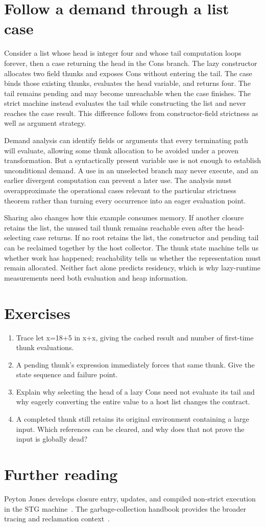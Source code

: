 \section{Follow a demand through a list case}
\label{sec:ch92-demand-example}
Consider a list whose head is integer four and whose tail computation loops forever, then a case returning the head in the Cons branch.
The lazy constructor allocates two field thunks and exposes Cons without entering the tail.
The case binds those existing thunks, evaluates the head variable, and returns four.
The tail remains pending and may become unreachable when the case finishes.
The strict machine instead evaluates the tail while constructing the list and never reaches the case result.
This difference follows from constructor-field strictness as well as argument strategy.

Demand analysis can identify fields or arguments that every terminating path will evaluate, allowing some thunk allocation to be avoided under a proven transformation.
But a syntactically present variable use is not enough to establish unconditional demand.
A use in an unselected branch may never execute, and an earlier divergent computation can prevent a later use.
The analysis must overapproximate the operational cases relevant to the particular strictness theorem rather than turning every occurrence into an eager evaluation point.

Sharing also changes how this example consumes memory.
If another closure retains the list, the unused tail thunk remains reachable even after the head-selecting case returns.
If no root retains the list, the constructor and pending tail can be reclaimed together by the host collector.
The thunk state machine tells us whether work has happened; reachability tells us whether the representation must remain allocated.
Neither fact alone predicts residency, which is why lazy-runtime measurements need both evaluation and heap information.

\section{Exercises}
\label{sec:ch92-exercises}
\begin{enumerate}
\item\label{ex:ch92-share} Trace let x=18+5 in x+x, giving the cached result and number of first-time thunk evaluations.
\item\label{ex:ch92-blackhole} A pending thunk's expression immediately forces that same thunk.
Give the state sequence and failure point.
\item\label{ex:ch92-fields} Explain why selecting the head of a lazy Cons need not evaluate its tail and why eagerly converting the entire value to a host list changes the contract.
\item\label{ex:ch92-retention} A completed thunk still retains its original environment containing a large input.
Which references can be cleared, and why does that not prove the input is globally dead?
\end{enumerate}

\section{Further reading}
\label{sec:ch92-reading}
Peyton Jones develops closure entry, updates, and compiled non-strict execution in the STG machine~\cite{peytonjones-1992-stg}.
The garbage-collection handbook provides the broader tracing and reclamation context~\cite{jones-2023-garbage}.
